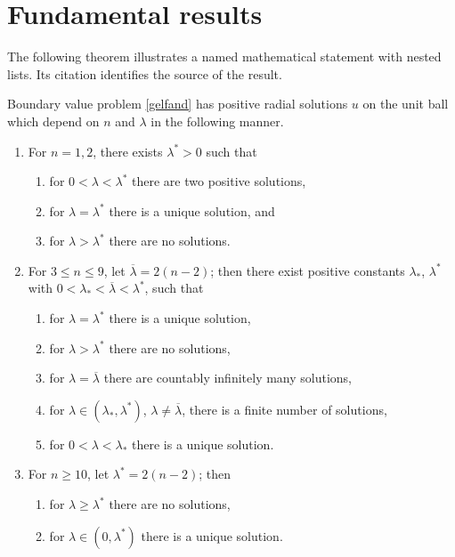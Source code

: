 \section{Fundamental results}
The following theorem illustrates a named mathematical statement with nested
lists. Its citation identifies the source of the result.


\begin{theorem}
  Boundary value problem \eqref{gelfand} has positive radial solutions $u$ on
  the unit ball which depend on $n$ and $\lambda$ in the following manner.
  \begin{enumerate}
    \item For $n=1,2$, there exists $\lambda^* >0$ such that
    \begin{enumerate}
      \item for $0< \lambda < \lambda^*$ there are two positive
      solutions,
      \item for $\lambda =\lambda^*$ there is a unique solution, and
      \item for $\lambda > \lambda^*$ there are no solutions.
    \end{enumerate}
    \item For $3\leq n \leq 9$, let $\overline{\lambda}=2(n-2)$; then
    there exist positive constants $\lambda_*$, $\lambda^*$ with
    $0< \lambda_* < \overline{\lambda} < \lambda^*$, such that
    \begin{enumerate}
      \item for $\lambda = \lambda^*$ there is a unique solution,
      \item for $\lambda > \lambda^*$ there are no solutions,
      \item for $\lambda = \overline{\lambda}$ there are countably
        infinitely many solutions,
      \item for $\lambda \in (\lambda_*,\lambda^*)$, $\lambda \neq
      \overline{\lambda}$, there is a finite number of solutions,
      \item for $0 < \lambda < \lambda_*$ there is a unique solution.
    \end{enumerate}
    \item For $n\geq 10$, let $\lambda^* = 2(n-2)$; then
    \begin{enumerate}
      \item for $\lambda \geq \lambda^*$ there are no solutions,
      \item for $\lambda \in (0,\lambda^*)$ there is a unique solution.
    \end{enumerate}
  \end{enumerate}
\end{theorem}
